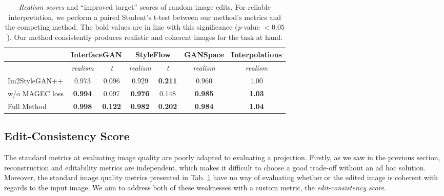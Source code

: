 

\begin{table}
\centering
\begin{tabular}{|l|c|c|c|c|c|c|}
\hline
               & \multicolumn{2}{c|}{ InterfaceGAN} & \multicolumn{2}{c|}{ StyleFlow} &  GANSpace &  Interpolations \\ \hline
               &  \textit{realism}      &  \textit{t}         &  \textit{realism}    &  \textit{t}        &  \textit{realism}  &  \textit{realism}        \\ \hline
 Im2StyleGAN++  &  0.973                 &  0.096     &  0.929               &  \textbf{0.211}    &  0.960             &  1.00           \\ \hline
 w/o MAGEC loss &  \textbf{0.994}        &  0.097              &  \textbf{0.976}      &  0.148             &  \textbf{0.985}    &  \textbf{1.03}                    \\ \hline
 Full Method    &  \textbf{0.998}        &  \textbf{0.122}     &  \textbf{0.982}      &  \textbf{0.202}    &  \textbf{0.984}    &  \textbf{1.04}           \\ \hline
\end{tabular}\caption{ \emph{Realism scores} and ``improved target'' scores of random image edits. For reliable interpretation, we perform a paired Student's t-test between our method's metrics and the competing method. The bold values are in line with this significance (\emph{p}-value $< 0.05$). Our method consistently produces realistic and coherent images for the task at hand.}\label{tab:standard_metrics}
\end{table}




\subsection{Edit-Consistency Score}

The standard metrics at evaluating image quality are poorly adapted to evaluating a 
projection. Firstly, as we saw in the previous section, reconstruction and editability 
metrics are independent, which makes it difficult to choose a good trade-off without an 
ad hoc solution. Moreover, the standard image quality metrics presented in Tab. \ref{tab:standard_metrics}
have no way of evaluating whether or the edited image is coherent with regards to the input image. 
We aim to address both of these weaknesses with a custom metric, the \emph{edit-consistency score}.
 
